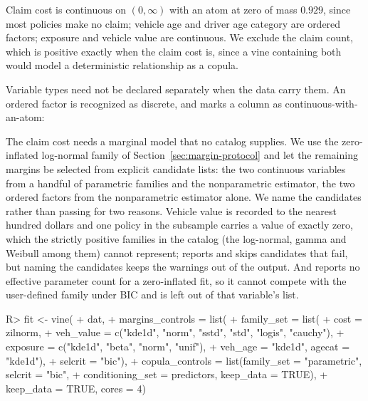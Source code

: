 \documentclass[article]{jss}
\begin{document}
Claim cost is continuous on $(0, \infty)$ with an atom at zero of mass
$0.929$, since most policies make no claim; vehicle age and driver age
category are ordered factors; exposure and vehicle value are continuous.  We
exclude the claim count, which is positive exactly when the claim cost is,
since a vine containing both would model a deterministic relationship as a
copula.

Variable types need not be declared separately when the data carry them.  An
ordered factor is recognized as discrete, and  marks a
column as continuous-with-an-atom:

\begin{CodeChunk}
\end{CodeChunk}

The claim cost needs a marginal model that no catalog supplies.  We use the
zero-inflated log-normal family of Section~\ref{sec:margin-protocol} and let
the remaining margins be selected from explicit candidate lists: the two
continuous variables from a handful of parametric families and the
nonparametric estimator, the two ordered factors from the nonparametric
estimator alone.  We name the candidates rather than passing 
for two reasons.  Vehicle value is recorded to the nearest hundred dollars and
one policy in the subsample carries a value of exactly zero, which the
strictly positive families in the  catalog (the log-normal,
gamma and Weibull among them) cannot represent;  reports and
skips candidates that fail, but naming the candidates keeps the warnings out
of the output.  And  reports no effective parameter count for a
zero-inflated fit, so it cannot compete with the user-defined family under
BIC and is left out of that variable's list.

\begin{CodeChunk}
\begin{CodeInput}
R> fit <- vine(
+    dat,
+    margins_controls = list(
+      family_set = list(
+        cost = zilnorm,
+        veh_value = c("kde1d", "norm", "sstd", "std", "logis", "cauchy"),
+        exposure = c("kde1d", "beta", "norm", "unif"),
+        veh_age = "kde1d", agecat = "kde1d"),
+      selcrit = "bic"),
+    copula_controls = list(family_set = "parametric", selcrit = "bic",
+                           conditioning_set = predictors, keep_data = TRUE),
+    keep_data = TRUE, cores = 4)
\end{CodeInput}
\end{CodeChunk}
\end{document}
